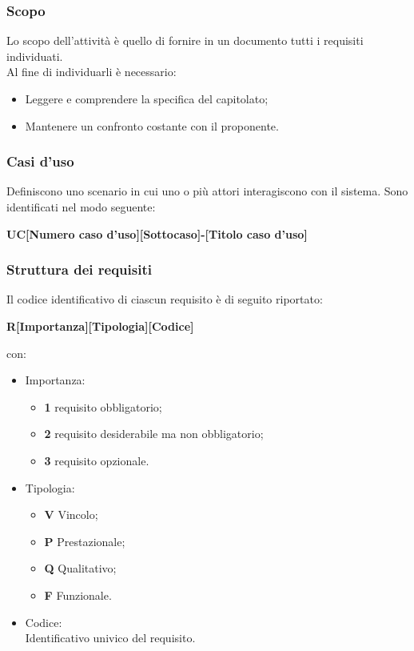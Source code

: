     \subsubsection{Scopo}
    Lo scopo dell'attività è quello di fornire in un documento tutti i requisiti individuati.\\
    Al fine di individuarli è necessario:
    \begin{itemize}
      \item Leggere e comprendere la specifica del capitolato;
      \item Mantenere un confronto costante con il proponente.
    \end{itemize}
    \subsubsection{Casi d'uso}
    Definiscono uno scenario in cui uno o più attori interagiscono con il sistema. Sono identificati nel modo seguente:
    \begin{center}
      \textbf{UC[Numero caso d'uso][Sottocaso]-[Titolo caso d'uso]}\\
    \end{center}
    \subsubsection{Struttura dei requisiti}
      Il codice identificativo di ciascun requisito è di seguito riportato:
      \begin{center}
        \textbf{R[Importanza][Tipologia][Codice]}\\
      \end{center}
      con:
      \begin{itemize}
        \item Importanza: 
        \begin{itemize}
          \item \textbf{1} requisito obbligatorio;
          \item \textbf{2} requisito desiderabile ma non obbligatorio;
          \item \textbf{3} requisito opzionale.
        \end{itemize}
  
        \item Tipologia: 
        \begin{itemize}
          \item \textbf{V} Vincolo;
          \item \textbf{P} Prestazionale;
          \item \textbf{Q} Qualitativo;
          \item \textbf{F} Funzionale.
        \end{itemize}
  
        \item Codice:\\
        Identificativo univico del requisito.
      \end{itemize}

